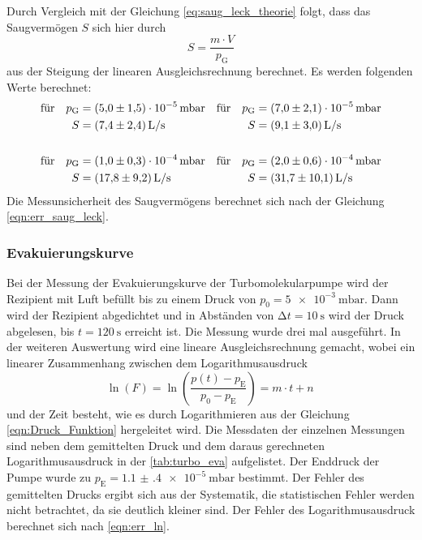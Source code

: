     \noindent Durch Vergleich mit der Gleichung \eqref{eq:saug_leck_theorie} folgt, dass das Saugvermögen $S$ sich hier durch
    \begin{equation*}
      S = \frac{m \cdot V}{p_\text{G}}
    \end{equation*}
    aus der Steigung der linearen Ausgleichsrechnung berechnet. Es werden folgenden Werte berechnet:
    \begin{align*}
      \text{für} \quad p_\text{G} &= \SI{5.0(15)e-5}{\milli\bar}   & \text{für} \quad p_\text{G} &= \SI{7.0(21)e-5}{\milli\bar} \\
      S &= \SI{7.4 \pm 2.4}{L\per\second}                 & S &= \SI{9.1 \pm 3.0}{L\per\second}  \\
      \\
      \text{für} \quad p_\text{G} &= \SI{1.0(3)e-4}{\milli\bar}  & \text{für} \quad p_\text{G} &= \SI{2.0(6)e-4}{\milli\bar} \\
      S &= \SI{17.8 \pm 9.2}{L\per\second}                & S &= \SI{31.7 \pm 10.1}{L\per\second}  
    \end{align*}
    Die Messunsicherheit des Saugvermögens berechnet sich nach der Gleichung \eqref{eqn:err_saug_leck}.

  \subsubsection{Evakuierungskurve}

    \noindent Bei der Messung der Evakuierungskurve der Turbomolekularpumpe wird der Rezipient mit Luft befüllt bis zu einem Druck von $p_0 = \SI{5e-3}{\milli\bar}$. Dann wird der Rezipient 
    abgedichtet und in Abständen von $\increment t = \SI{10}{\second}$ wird der Druck abgelesen, bis $ t = \SI{120}{\second}$ erreicht ist. Die Messung wurde drei mal ausgeführt.
    In der weiteren Auswertung wird eine lineare Ausgleichsrechnung gemacht, wobei ein linearer Zusammenhang zwischen dem Logarithmusausdruck 
    \begin{equation*}
      \ln(F) = \ln \left( \frac{p(t) - p_\text{E}}{p_0 - p_\text{E}}\right) = m \cdot t + n \, 
    \end{equation*} 
    und der Zeit besteht, wie es durch Logarithmieren aus der Gleichung \eqref{eqn:Druck_Funktion} hergeleitet wird. Die Messdaten der einzelnen Messungen sind neben dem gemittelten Druck und dem daraus gerechneten Logarithmusausdruck in der \autoref{tab:turbo_eva} aufgelistet. 
    Der Enddruck der Pumpe wurde zu $p_\text{E} = \SI{1.1(4)e-5}{\milli\bar}$ bestimmt. Der Fehler des gemittelten Drucks ergibt sich aus der Systematik, die statistischen Fehler werden nicht betrachtet, da sie deutlich kleiner sind.
    Der Fehler des Logarithmusausdruck berechnet sich nach \eqref{eqn:err_ln}. 
  


